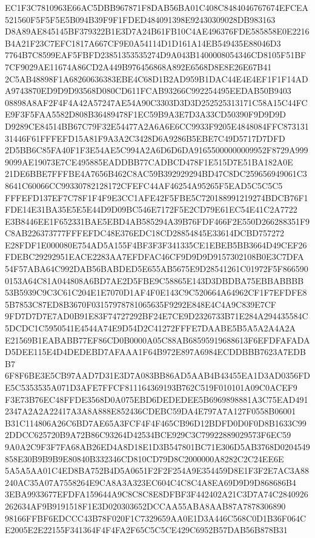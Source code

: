 \documentclass[UTF8,fontset=fandol,zihao=-4,a4paper]{ctexart}
\begin{document}
{{EC1F3C7810963E66AC5DBB967871F8DAB56BA01C408C8484046767674EFCEA521560F5F5F5E5B094B39F9F1FDED484091398E92430309028DB983163
D8A89AE845145BF379322B1E3D7A24B61FB10C4AE496376FDE585858E0E2216B4A21F23C7EFC1817A667CF9E0A54114D1D161A14EB549435E88046D3
7764B7C8599EAF5FBFD23851353535274D9A043B1400008054346CD8105F51BF7CF9029AE11674A86CD2A449B976456868A892E6568D8E8E26E67B41
2C5AB48898F1A68260636383EBE4C68D1B2AD959B1DAC44E4E4EF1F1F14ADA9743870ED9D9D93568D080CD611FCAB93266C992254495EEDAB50B9403
08898A8AF2F4F4A42A57247AE54A90C3303D3D3D252525313171C58A15C44FCE9F3F5FAA5582D808B36489478F1EC59B9A3E7D3A33CD50390F9D9D9D
D9289CE84514BB67C79F32E54477A2A6A6E6CC9933F9205E4848084FFC87313131446F61FFFEFD15A81F9A3A2C3428D6A9286B5EBE7C49D5717D7DFD
2D5BB6C85FA40F1F3E54AE5C994A2A6D6D6DA91655000000009952F8729A9999099AE19073E7CE495885EADDBB77CADBCD478F1E515D7E51BA182A0E
21DE6BBE7FFFBE4A7656B462C8AC59B392929294BD47C8DC259656949061C38641C60066CC99330782128172CFEFC44AF46254A95265F5EAD5C5C5C5
FFFEFD137EF7C78F1F4F9E3CC1AFE42F5FBE5C720188991219274BDCB76F1FDE14E31BA35E5E5E44D9D09BC546E7172F5E2CD79E61EC54E41C2A7722
E3B8446EE1F652331BAE5EBD4AB585294A39B76FDF466F2E550D266288351F9C8AB226373777FFFEFDC48E376EDC18CD28854845E33614DCBD757272
E28FDF1E000080E754AD5A155F4BF3F3F341335CE1EBEB5BB3664D49CEF26FDEBC29292951EACE2283AA7EFDFAC46CF9D9D9D9157302108B0E3C7DFA
54F57ABA64C992DAB56BABDED5E655AB5675E9D28541261C01972F5F8665900153A64C81A044808A6BD7AE2D5FBE9C58865E143D3DBDBA75EBBABBBB
53B5939C9C3C61C204E1E7070D1AF4F0E143C9C520664A64962CF1F7EFDFE85B7853C87ED8B3670F03157978781065635F9292E848E4C4A9C839E7CF
9FD7D7D7E7AD0B91E83F74727292BF24E7CE9D2326733B71E284A294435584C5DCDC1C5950541E4544A74E9D54D2C41272FFFE7DAABE5B5A5A2A4A2A
E21569B1EABABB77EF86CD0B0000A05C88AB68595919688613F6EFDFAFADAD5DEE115E4D4DEDEBD7AFAAA1F64B972E897A6984ECDDBBB7623A7EDBB7
6F8F6BE3E5CB97AAD7D31E3D7A083BB86AD5AAB4B43455EA1D3AD0356FDE5C5353535A071D3AFE7FFCF811164369193B762C519F010101A09C0ACEF9
F3E73B76EC48FFDE3568D0A075EBD6DEDEDEE5B6969898881A3C75EAD4912347A2A2A22417A3A8A888E852436CDEBC59DA4E797A7A127F0558B06001
B31C114806A26C6BD7AE65A3FCF4F4F465CB96D12BDFD0D0F0D8B1633C992DDCC625720B9A72B86C93264D42534BCE929C3C79922889029573F6EC59
9A0A2C9F3F7FA68AB26ED4A8D18E1D3B547801BC71E306D5AB3768D0204549858E30B9B9B9E80840B332346CD810CD79D8C2000000A8282C2C24EE6E
5A5A5AA01C4ED8BA752B4D5A0651F2F2F254A9E354459D8E1F3F2E7AC3A88240AC35A07A7558264E9CA8A3A323EC604C4C8C4A8EA69D9D9D868686B4
3EBA9933677EFDFA159644A9C8C8C8E8DFBF3F442402A21C3D7A74C2840926262634AF9B9191518F1E3D020303652DCCAA55ABA8AAB87A7878306890
98166FFBF6EDCCC43B78F020F1C7329659AA0E1D3A446C568C0D1B36F064CE2005E2E22155F341364F4F4FA2F65C5C5CE429C6952B57DAB56B878B31
}}
\end{document}
